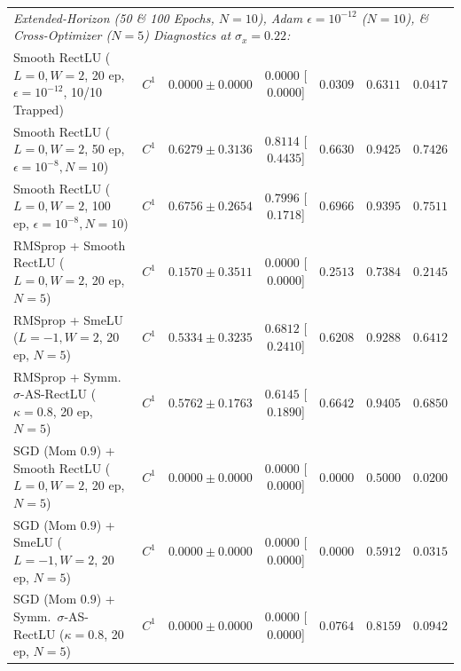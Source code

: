 \documentclass[11pt, a4paper]{article}
\begin{document}
\begin{table}[!htbp]
{\begin{tabular}{l l c c c c c}
\midrule
\multicolumn{7}{l}{\textit{Extended-Horizon (50 \& 100 Epochs, $N=10$), Adam $\epsilon = 10^{-12}$ ($N=10$), \& Cross-Optimizer ($N=5$) Diagnostics at $\sigma_{x} = 0.22$:}} \\
\rowcolor{alertred}
Smooth RectLU ($L=0, W=2$, 20 ep, $\epsilon=10^{-12}$, 10/10 Trapped) & $C^{1}$ & $0.0000 \pm 0.0000$ & $0.0000$ [$0.0000$] & $0.0309$ & $0.6311$ & $0.0417$ \\
Smooth RectLU ($L=0, W=2$, 50 ep, $\epsilon=10^{-8}, N=10$) & $C^{1}$ & $0.6279 \pm 0.3136$ & $0.8114$ [$0.4435$] & $0.6630$ & $0.9425$ & $0.7426$ \\
Smooth RectLU ($L=0, W=2$, 100 ep, $\epsilon=10^{-8}, N=10$) & $C^{1}$ & $0.6756 \pm 0.2654$ & $0.7996$ [$0.1718$] & $0.6966$ & $0.9395$ & $0.7511$ \\
\rowcolor{alertred}
RMSprop + Smooth RectLU ($L=0, W=2$, 20 ep, $N=5$) & $C^{1}$ & $0.1570 \pm 0.3511$ & $0.0000$ [$0.0000$] & $0.2513$ & $0.7384$ & $0.2145$ \\
RMSprop + SmeLU ($L=-1, W=2$, 20 ep, $N=5$) & $C^{1}$ & $0.5334 \pm 0.3235$ & $0.6812$ [$0.2410$] & $0.6208$ & $0.9288$ & $0.6412$ \\
\rowcolor{goodgreen}
RMSprop + Symm.\ $\sigma$-AS-RectLU ($\kappa=0.8$, 20 ep, $N=5$) & $C^{1}$ & \textbf{$0.5762 \pm 0.1763$} & \textbf{$0.6145$} [$0.1890$] & \textbf{$0.6642$} & \textbf{$0.9405$} & \textbf{$0.6850$} \\
\rowcolor{alertred}
SGD (Mom $0.9$) + Smooth RectLU ($L=0, W=2$, 20 ep, $N=5$) & $C^{1}$ & $0.0000 \pm 0.0000$ & $0.0000$ [$0.0000$] & $0.0000$ & $0.5000$ & $0.0200$ \\
SGD (Mom $0.9$) + SmeLU ($L=-1, W=2$, 20 ep, $N=5$) & $C^{1}$ & $0.0000 \pm 0.0000$ & $0.0000$ [$0.0000$] & $0.0000$ & $0.5912$ & $0.0315$ \\
\rowcolor{goodgreen}
SGD (Mom $0.9$) + Symm.\ $\sigma$-AS-RectLU ($\kappa=0.8$, 20 ep, $N=5$) & $C^{1}$ & $0.0000 \pm 0.0000$ & $0.0000$ [$0.0000$] & \textbf{$0.0764$} & \textbf{$0.8159$} & \textbf{$0.0942$} \\
\bottomrule
\end{tabular}%
}
\end{table}
\end{document}
